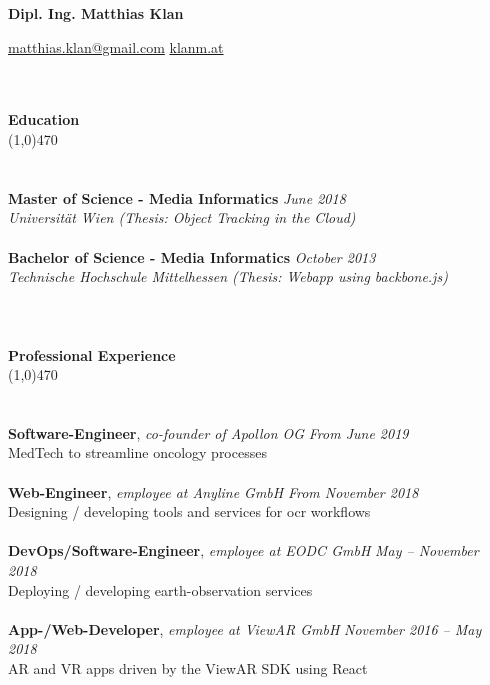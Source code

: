 \documentclass[10pt]{article} %
\begin{document}
\centerline{{\LARGE \bf Dipl. Ing. Matthias Klan}}
\centerline{\href{mailto:matthias.klan@gmail.com}{matthias.klan@gmail.com} \raisebox{0.25ex}{\tiny$\bullet$} \href{https://klanm.at}{klanm.at}}

\noindent %
\\\\
{\Large \bf Education}\\
\line(1,0){470}\\
\\\\
\noindent
{\bf Master of Science - Media Informatics} \hfill \textit{June 2018} \\ 
\textit{Universität Wien (Thesis: Object Tracking in the Cloud)}\\\\
\noindent
{\bf Bachelor of Science - Media Informatics} \hfill \textit{October 2013} \\
\textit{Technische Hochschule Mittelhessen (Thesis: Webapp using backbone.js)}\\
\\
\noindent %
\\\\
{\Large \bf Professional Experience}\\
\line(1,0){470}\\
\\\\
\noindent
{\bf Software-Engineer}, \textit{co-founder of Apollon OG}  \hfill \textit{ From June 2019 } \\ 
MedTech to streamline oncology processes  \\\\
\noindent
\noindent
{\bf Web-Engineer}, \textit{employee at Anyline GmbH}  \hfill \textit{ From November 2018 } \\ 
Designing / developing tools and services for ocr workflows   \\\\
\noindent
\noindent
{\bf DevOps/Software-Engineer}, \textit{employee at EODC GmbH}  \hfill \textit{ May -- November 2018 } \\ 
Deploying / developing earth-observation services\\\\
\noindent
\noindent
{\bf App-/Web-Developer}, \textit{employee at ViewAR GmbH}  \hfill \textit{ November 2016 -- May 2018 } \\ 
AR and VR apps driven by the ViewAR SDK using React\\\\
\end{document}
